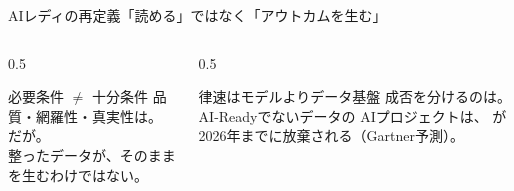 \begin{frame}{AIレディの再定義}{「読める」ではなく「アウトカムを生む」}
  \vskip1mm
  \begin{columns}[T]
    \begin{column}{0.5\textwidth}
      \begin{insight}{必要条件 $\neq$ 十分条件}
        \small
        品質・網羅性・真実性は。\\[0.6mm]
        だが。\\[0.6mm]
        整ったデータが、そのままを生むわけではない。
      \end{insight}
    \end{column}
    \begin{column}{0.5\textwidth}
      \begin{keytake}{律速はモデルよりデータ基盤}
        \small
        成否を分けるのは。\\[0.6mm]
        AI-Readyでないデータの AIプロジェクトは、
        が 2026年までに放棄される（Gartner予測）。
      \end{keytake}
    \end{column}
  \end{columns}
\end{frame}

